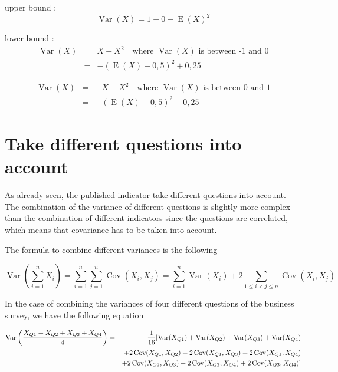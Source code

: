 \documentclass[12pt,a4paper,oneside]{book}
\DeclareMathOperator{\Var}{Var}
\DeclareMathOperator{\Cov}{Cov}
\DeclareMathOperator{\E}{E}
\begin{document}
upper bound : 
\begin{equation}
    \Var(X) = 1 - 0 - \E(X)^2
\end{equation}

lower bound : 
\begin{eqnarray}
\Var(X) &=& X - X^2 \quad \text{where } \Var(X) \text{ is between -1 and 0} \\
    &=& - (\E(X) + 0,5)^2 + 0,25 
\end{eqnarray}

\begin{eqnarray}
    \Var(X) &=& - X - X^2 \quad \text{where } \Var(X) \text{ is between 0 and 1} \\
        &=&  - (\E(X) - 0,5)^2 + 0,25
\end{eqnarray}
    

\section{Take different questions into account}

As already seen, the published indicator take different questions into account. 
The combination of the variance of different questions is slightly more complex than the combination of different indicators since the questions are correlated, which means that covariance has to be taken into account.

The formula to combine different variances is the following

\begin{equation}
\Var \left(\sum_{i=1}^{n} X_{i}\right) = \sum_{i=1}^{n} \sum_{j=1}^{n} \Cov\left(X_{i}, X_{j}\right)
= \sum_{i=1}^{n} \Var\left(X_{i}\right)+2 \sum_{1 \leq i<j \leq n} \Cov\left(X_{i}, X_{j}\right)
\end{equation}

In the case of combining the variances of four different questions of the business survey, we have the following equation

\begin{eqnarray}
    \Var \left(\frac{X_{Q1} + X_{Q2} + X_{Q3} + X_{Q4}}{4} \right) &=& \frac{1}{16} \large[ \Var(X_{Q1}) + \Var(X_{Q2}) + \Var(X_{Q3}) + \Var(X_{Q4}) \nonumber \\
    && + 2 \Cov (X_{Q1},X_{Q2}) + 2 \Cov (X_{Q1},X_{Q3}) + 2 \Cov (X_{Q1},X_{Q4}) \nonumber \\
    &&  + 2 \Cov (X_{Q2},X_{Q3}) + 2 \Cov (X_{Q2},X_{Q4}) + 2 \Cov (X_{Q3},X_{Q4}) \large] \nonumber
\end{eqnarray}
\end{document}
